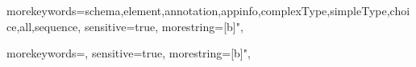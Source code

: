 			{morekeywords={schema,element,annotation,appinfo,complexType,simpleType,choice,all,sequence},		
			sensitive=true,
			morestring=[b]",
		}
		
			{morekeywords={},		
			sensitive=true,
			morestring=[b]",
		}
		
	

	
		
			
	
		\setlength{\parskip}{1.5ex plus 0.0ex minus 0.0ex}
		\setlength{\parindent}{0pt}
	
		\renewcommand{\floatpagefraction}{0.9}
		\renewcommand{\topfraction}{0.9}
		\renewcommand{\bottomfraction}{0.9}
		\renewcommand{\textfraction}{0.1}
		\renewcommand{\textfloatsep}{5mm}
	
		\renewcommand{\baselinestretch}{1.0}

		\fancyhf{} %
		\fancyhead[EL]{\nouppercase{\leftmark}}
		\fancyhead[OR]{\nouppercase{\rightmark}}
		\fancyfoot[EL,OR]{\thepage}	
		
